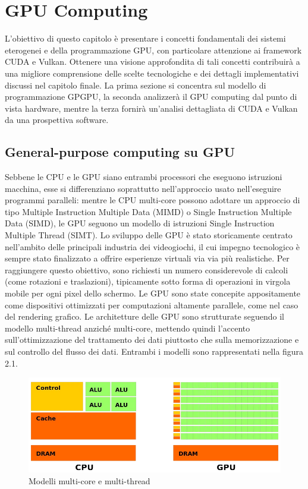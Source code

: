 \chapter{GPU Computing}
\label{sec:gpu}


L'obiettivo di questo capitolo è presentare i concetti fondamentali dei sistemi eterogenei e della programmazione GPU, con particolare attenzione ai framework CUDA e Vulkan. Ottenere una visione approfondita di tali concetti contribuirà a una migliore comprensione delle scelte tecnologiche e dei dettagli implementativi discussi nel capitolo finale. La prima sezione si concentra sul modello di programmazione GPGPU, la seconda analizzerà il GPU computing dal punto di vista hardware, mentre la terza fornirà un'analisi dettagliata di CUDA e Vulkan da una prospettiva software.

\section[General-purpose computing su GPU]{General-purpose computing su GPU}

Sebbene le CPU e le GPU siano entrambi processori che eseguono istruzioni macchina, esse si differenziano soprattutto nell'approccio usato nell'eseguire programmi paralleli: mentre le CPU multi-core possono adottare un approccio di tipo Multiple Instruction Multiple Data (MIMD) o Single Instruction Multiple Data (SIMD), le GPU seguono un modello di istruzioni Single Instruction Multiple Thread (SIMT). Lo sviluppo delle GPU è stato storicamente centrato nell'ambito delle principali industria dei videogiochi, il cui impegno tecnologico è sempre stato finalizzato a offrire esperienze virtuali via via più realistiche. Per raggiungere questo obiettivo, sono richiesti un numero considerevole di calcoli (come rotazioni e traslazioni), tipicamente sotto forma di operazioni in virgola mobile per ogni pixel dello schermo. Le GPU sono state concepite appositamente come dispositivi ottimizzati per computazioni altamente parallele, come nel caso del rendering grafico. Le architetture delle GPU sono strutturate seguendo il modello multi-thread anziché multi-core, mettendo quindi l'accento sull'ottimizzazione del trattamento dei dati piuttosto che sulla memorizzazione e sul controllo del flusso dei dati.
Entrambi i modelli sono rappresentati nella figura 2.1.

\begin{figure}[ht]
    \centering
    \includegraphics[width=.9\linewidth]{images/chapter2/cpu_vs_gpu_model.png}
    \caption{Modelli multi-core e multi-thread}
    \label{fig:cpu_vs_gpu_model}
\end{figure}

